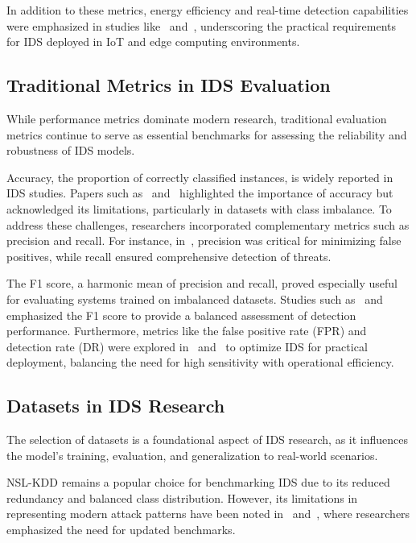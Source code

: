 In addition to these metrics, energy efficiency and real-time detection capabilities were emphasized in studies like~\cite{Gutierrez2023} and~\cite{Chen2024}, underscoring the practical requirements for IDS deployed in IoT and edge computing environments.




\subsection{Traditional Metrics in IDS Evaluation}
While performance metrics dominate modern research, traditional evaluation metrics continue to serve as essential benchmarks for assessing the reliability and robustness of IDS models.

Accuracy, the proportion of correctly classified instances, is widely reported in IDS studies. Papers such as~\cite{Mirlekar2022} and~\cite{wang2023} highlighted the importance of accuracy but acknowledged its limitations, particularly in datasets with class imbalance. To address these challenges, researchers incorporated complementary metrics such as precision and recall. For instance, in~\cite{Meena2021}, precision was critical for minimizing false positives, while recall ensured comprehensive detection of threats.

The F1 score, a harmonic mean of precision and recall, proved especially useful for evaluating systems trained on imbalanced datasets. Studies such as~\cite{Jayalaxmi2022} and~\cite{Mohammad2024} emphasized the F1 score to provide a balanced assessment of detection performance. Furthermore, metrics like the false positive rate (FPR) and detection rate (DR) were explored in~\cite{aljuaid2024deep} and~\cite{Roshan2024} to optimize IDS for practical deployment, balancing the need for high sensitivity with operational efficiency.



\subsection{Datasets in IDS Research}
The selection of datasets is a foundational aspect of IDS research, as it influences the model's training, evaluation, and generalization to real-world scenarios.

NSL-KDD remains a popular choice for benchmarking IDS due to its reduced redundancy and balanced class distribution. However, its limitations in representing modern attack patterns have been noted in~\cite{Mirlekar2022} and~\cite{Rele2023}, where researchers emphasized the need for updated benchmarks.

